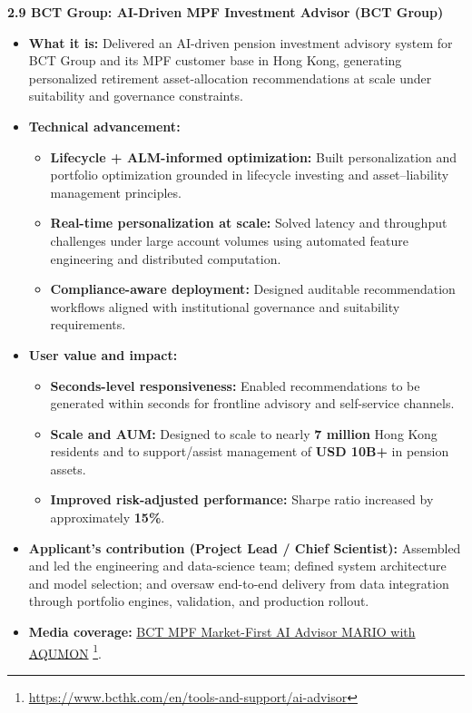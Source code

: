 \documentclass[11pt]{article}
\newcommand{\CVSubsection}[1]{\textbf{#1}\par}
\newenvironment{tightitemize}{%
  \begin{itemize}[leftmargin=*,nosep,topsep=2pt]
}{\end{itemize}}
\begin{document}
\vspace{0.8em}

\CVSubsection{2.9 BCT Group: AI-Driven MPF Investment Advisor (BCT Group)}

\begin{tightitemize}
  \item \textbf{What it is:} Delivered an AI-driven pension investment advisory system for BCT Group and its MPF customer base in Hong Kong, generating personalized retirement asset-allocation recommendations at scale under suitability and governance constraints.
  \item \textbf{Technical advancement:}
  \begin{tightitemize}
    \item \textbf{Lifecycle + ALM-informed optimization:} Built personalization and portfolio optimization grounded in lifecycle investing and asset--liability management principles.
    \item \textbf{Real-time personalization at scale:} Solved latency and throughput challenges under large account volumes using automated feature engineering and distributed computation.
    \item \textbf{Compliance-aware deployment:} Designed auditable recommendation workflows aligned with institutional governance and suitability requirements.
  \end{tightitemize}
  \item \textbf{User value and impact:}
  \begin{tightitemize}
    \item \textbf{Seconds-level responsiveness:} Enabled recommendations to be generated within seconds for frontline advisory and self-service channels.
    \item \textbf{Scale and AUM:} Designed to scale to nearly \textbf{7 million} Hong Kong residents and to support/assist management of \textbf{USD 10B+} in pension assets.
    \item \textbf{Improved risk-adjusted performance:} Sharpe ratio increased by approximately \textbf{15\%}.
  \end{tightitemize}
  \item \textbf{Applicant’s contribution (Project Lead / Chief Scientist):} Assembled and led the engineering and data-science team; defined system architecture and model selection; and oversaw end-to-end delivery from data integration through portfolio engines, validation, and production rollout.
   \item \textbf{Media coverage:}
  \href{https://www.bcthk.com/en/tools-and-support/ai-advisor}{BCT MPF Market-First AI Advisor MARIO with AQUMON}
  \footnote{\url{https://www.bcthk.com/en/tools-and-support/ai-advisor}}.
\end{tightitemize}
\end{document}
